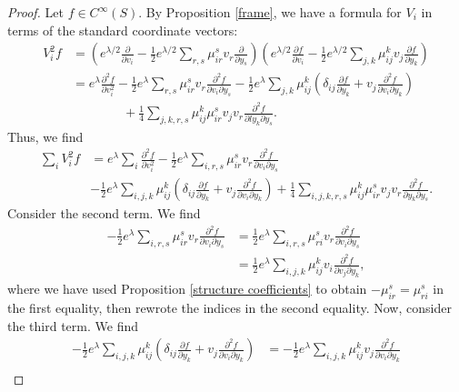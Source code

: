 \documentclass{amsart}
\theoremstyle{plain}
\theoremstyle{definition}
\theoremstyle{remark}
\begin{document}
\begin{proof}
		Let $f \in C^\infty(S)$. By Proposition \ref{frame}, we have a formula for $V_i$ in terms of the standard coordinate vectors:
		\begin{align*}
			V_i^2 f  &= \left(e^{\lambda/2} \frac{\partial}{\partial v_i} - \frac12 e^{\lambda/2} \sum_{r,s} \mu_{ir}^s v_r \frac{\partial}{\partial y_s}\right)
			 \left(e^{\lambda/2} \frac{\partial f}{\partial v_i} - \frac12 e^{\lambda/2} \sum_{j,k} \mu_{ij}^k v_j \frac{\partial f}{\partial y_k}\right) \\
			 &= e^\lambda \frac{\partial^2 f}{\partial v_i^2} - \frac12 e^\lambda \sum_{r,s} \mu_{ir}^s v_r \frac{\partial^2 f}{\partial v_i\partial y_s } - \frac12 e^\lambda \sum_{j,k} \mu_{ij}^k \left(\delta_{ij} \frac{\partial f}{\partial y_k} + v_j \frac{\partial^2 f}{\partial v_i\partial y_k }\right) \\
			 & \qquad \qquad + \frac14 \sum_{j,k,r,s} \mu_{ij}^k \mu_{ir}^s v_j v_r \frac{\partial^2 f}{\partial ly_k \partial y_s}.
		\end{align*}
		Thus, we find 
		\begin{align*}
			\sum_i V_i^2 f &= e^\lambda \sum_i\frac{\partial^2 f}{\partial v_i^2} - \frac12 e^\lambda \sum_{i,r,s} \mu_{ir}^s v_r \frac{\partial^2 f}{\partial v_i\partial y_s }  \\
			& - \frac12 e^\lambda \sum_{i,j,k} \mu_{ij}^k \left(\delta_{ij} \frac{\partial f}{\partial y_k} + v_j \frac{\partial^2 f}{\partial v_i\partial y_k }\right) + \frac14 \sum_{i,j,k,r,s} \mu_{ij}^k \mu_{ir}^s v_j v_r \frac{\partial^2 f}{\partial y_k \partial y_s}.
		\end{align*}
		Consider the second term. We find 
		\begin{align*}
			 - \frac12 e^\lambda \sum_{i,r,s} \mu_{ir}^s v_r \frac{\partial^2 f}{\partial v_i\partial y_s }  &=  \frac12 e^\lambda \sum_{i,r,s} \mu_{ri}^s v_r \frac{\partial^2 f}{\partial v_i\partial y_s } \\
			 &= \frac12 e^\lambda \sum_{i,j,k} \mu_{ij}^k v_i \frac{\partial^2 f}{\partial v_j\partial y_k },
		\end{align*}
		where we have used Proposition \ref{structure coefficients} to obtain $-\mu_{ir}^s = \mu_{ri}^s$ in the first equality, then rewrote the indices in the second equality. Now, consider the third term. We find 
		\begin{align*}
			- \frac12 e^\lambda \sum_{i,j,k} \mu_{ij}^k \left(\delta_{ij} \frac{\partial f}{\partial y_k} + v_j \frac{\partial^2 f}{\partial v_i\partial y_k }\right) &= - \frac12 e^\lambda \sum_{i,j,k} \mu_{ij}^k v_j \frac{\partial^2 f}{\partial v_i\partial y_k } \\

\end{align*}
\end{proof}
\end{document}
